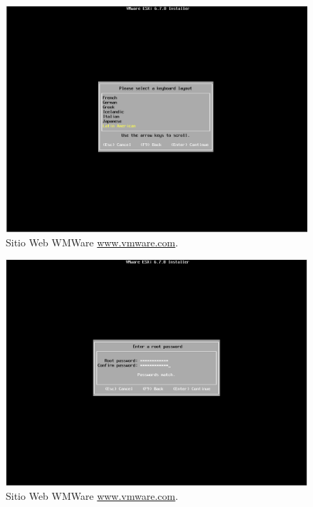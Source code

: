 \begin{figure}[!hbtp]
	\centering
	\includegraphics[width=\linewidth]{RE01_VMwareESXi/RE_VMwareInstalacion09.png}
	\vspace{-0.2cm}
	\caption{Sitio Web WMWare \url{www.vmware.com}.\footnotemark[2]{} }
	\label{fig:VMwareInstalacion09}
\end{figure}


\begin{figure}[!hbtp]
	\centering
	\includegraphics[width=\linewidth]{RE01_VMwareESXi/RE_VMwareInstalacion10.png}
	\vspace{-0.2cm}
	\caption{Sitio Web WMWare \url{www.vmware.com}.\footnotemark[2]{} }
	\label{fig:VMwareInstalacion10}
\end{figure}


